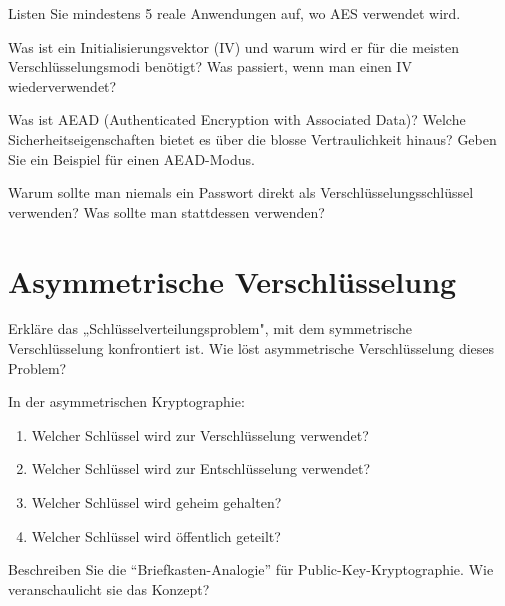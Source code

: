 \documentclass[11pt,a4paper]{report}
\begin{document}
\begin{ex}
Listen Sie mindestens 5 reale Anwendungen auf, wo AES verwendet wird.
\end{ex}

\begin{ex}
Was ist ein Initialisierungsvektor (IV) und warum wird er für die meisten Verschlüsselungsmodi benötigt? Was passiert, wenn man einen IV wiederverwendet?
\end{ex}

\begin{ex}
Was ist AEAD (Authenticated Encryption with Associated Data)? Welche Sicherheitseigenschaften bietet es über die blosse Vertraulichkeit hinaus? Geben Sie ein Beispiel für einen AEAD-Modus.
\end{ex}

\begin{ex}
Warum sollte man niemals ein Passwort direkt als Verschlüsselungsschlüssel verwenden? Was sollte man stattdessen verwenden?
\end{ex}

\section{Asymmetrische Verschlüsselung}

\begin{ex}
Erkläre das „Schlüsselverteilungsproblem", mit dem symmetrische Verschlüsselung konfrontiert ist. Wie löst asymmetrische Verschlüsselung dieses Problem?
\end{ex}

\begin{ex}
In der asymmetrischen Kryptographie:
\begin{enumerate}[label=\alph*)]
    \item Welcher Schlüssel wird zur Verschlüsselung verwendet?
    \item Welcher Schlüssel wird zur Entschlüsselung verwendet?
    \item Welcher Schlüssel wird geheim gehalten?
    \item Welcher Schlüssel wird öffentlich geteilt?
\end{enumerate}
\end{ex}

\begin{ex}
Beschreiben Sie die ``Briefkasten-Analogie'' für Public-Key-Kryptographie. Wie veranschaulicht sie das Konzept?
\end{ex}
\end{document}
